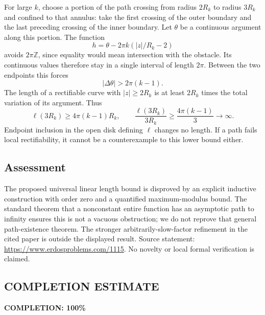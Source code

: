 For large $k$, choose a portion of the path crossing from radius $2R_k$ to radius $3R_k$ and confined to that annulus: take the first crossing of the outer boundary and the last preceding crossing of the inner boundary. Let $\theta$ be a continuous argument along this portion. The function
\[
 h=\theta-2\pi k(|z|/R_k-2)
\]
avoids $2\pi\mathbb Z$, since equality would mean intersection with the obstacle. Its continuous values therefore stay in a single interval of length $2\pi$. Between the two endpoints this forces
\[
 |\Delta\theta|>2\pi(k-1).
\]
The length of a rectifiable curve with $|z|\ge2R_k$ is at least $2R_k$ times the total variation of its argument. Thus
\[
 \ell(3R_k)\ge4\pi(k-1)R_k,\qquad
 \frac{\ell(3R_k)}{3R_k}\ge\frac{4\pi(k-1)}3\longrightarrow\infty.
\]
Endpoint inclusion in the open disk defining $\ell$ changes no length. If a path fails local rectifiability, it cannot be a counterexample to this lower bound either.

\subsection*{Assessment}
The proposed universal linear length bound is disproved by an explicit inductive construction with order zero and a quantified maximum-modulus bound. The standard theorem that a nonconstant entire function has an asymptotic path to infinity ensures this is not a vacuous obstruction; we do not reprove that general path-existence theorem. The stronger arbitrarily-slow-factor refinement in the cited paper is outside the displayed result.
Source statement: \url{https://www.erdosproblems.com/1115}. No novelty or local formal verification is claimed.
\subsection*{COMPLETION ESTIMATE}
\textbf{COMPLETION: 100\%}
